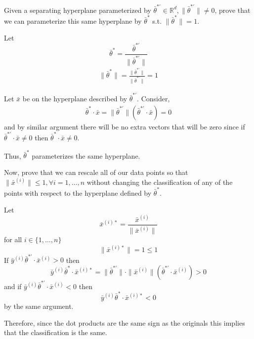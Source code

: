 \documentclass[12pt, letterpaper]{article}
\newcommand{\R}{\mathbb{R}}
\begin{document}
\begin{subproblem}{}
    Given a separating hyperplane parameterized by $\bar{\theta}^{*'} \in \R^d, \|\bar{\theta}^{*'}\| \neq 0$, 
    prove that we can parameterize this same hyperplane by $\bar{\theta}^*$ s.t. $\|\bar{\theta}^*\| = 1$.
\end{subproblem}
\begin{problemproof}
    Let \[\bar{\theta}^{*} = \frac{\bar{\theta}^{*'}}{\|\bar{\theta}^{*'}\|}\]
    \begin{align*}
        \|\bar{\theta}^{*}\| = \frac{\|\bar{\theta}^{*'}\|}{\|\bar{\theta}^{*'}\|} = 1
    \end{align*}
    
    Let $\bar{x}$ be on the hyperplane described by $\bar{\theta}^{*'}$. Consider,
    \begin{align*}
        \bar{\theta}^{*} \cdot \bar{x} = \|\bar{\theta}^{*'}\|( \bar{\theta}^{*'} \cdot \bar{x} ) = 0
    \end{align*}
    and by similar argument there will be no extra vectors that will be zero since if 
    $\bar{\theta}^{*'} \cdot \bar{x} \neq 0$ then $\bar{\theta}^{*} \cdot \bar{x} \neq 0$.

    Thus, $\bar{\theta}^{*}$ parameterizes the same hyperplane.
\end{problemproof}

\begin{subproblem}{}
    Now, prove that we can rescale all of our data points so that $\|\bar{x}^{(i)}\| \leq 1, \forall i = 1, \dots, n$ without
    changing the classification of any of the points with respect to the hyperplane defined by $\bar{\theta}^{*}$.
\end{subproblem}
\begin{problemproof}
    Let \[\bar{x}^{(i)*} = \frac{\bar{x}^{(i)}}{\|\bar{x}^{(i)}\|}\]
    for all $i \in \{1,\dots,n\}$
    \[\|\bar{x}^{(i)*}\| = 1 \leq 1\]
    If $\bar{y}^{(i)}\bar{\theta}^{*'} \cdot \bar{x}^{(i)} > 0$ then
    \[\bar{y}^{(i)}\bar{\theta}^{*} \cdot \bar{x}^{(i)*} = \|\bar{\theta}^{*'}\| \cdot \|\bar{x}^{(i)}\|( \bar{\theta}^{*'} \cdot \bar{x}^{(i)} ) > 0\]
    and if $\bar{y}^{(i)}\bar{\theta}^{*'} \cdot \bar{x}^{(i)} < 0$ then
    \[\bar{y}^{(i)}\bar{\theta}^{*} \cdot \bar{x}^{(i)*} < 0\] by the same argument.

    Therefore, since the dot products are the same sign as the originals this implies that the classification is the same.
\end{problemproof}
\end{document}

